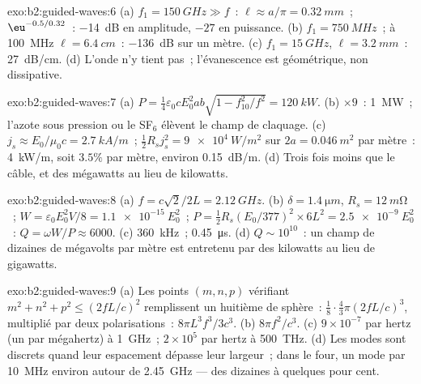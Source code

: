 \begin{solution}{exo:b2:guided-waves:6}
(a) $f_1 = \qty{150}{GHz} \gg f$~: $\ell \approx a/\pi = \qty{0.32}{mm}$~; $\eu^{-0.5/0.32}$~:
\qty{-14}{dB} en amplitude, $-27$ en puissance. (b) $f_1 = \qty{750}{MHz}$~; à \qty{100}{MHz}
$\ell = \qty{6.4}{cm}$~: \qty{-136}{dB} sur un mètre. (c) $f_1 = \qty{15}{GHz}$, $\ell =
\qty{3.2}{mm}$~: \qty{27}{dB/cm}. (d) L'onde n'y tient pas~; l'évanescence est
géométrique, non dissipative.
\end{solution}

\begin{solution}{exo:b2:guided-waves:7}
(a) $P = \tfrac14\varepsilon_0cE_0^2ab\sqrt{1 - f_{10}^2/f^2} = \qty{120}{kW}$. (b) $\times9$~:
\qty{1}{MW}~; l'azote sous pression ou le SF$_6$ élèvent le champ de claquage. (c)
$j_s \approx E_0/\mu_0c = \qty{2.7}{kA/m}$~; $\tfrac12R_sj_s^2 = \qty{9e4}{W/m^2}$ sur $2a =
\qty{0.046}{m^2}$ par mètre~: \qty{4}{kW/m}, soit $3.5\%$ par mètre, environ \qty{0.15}{dB/m}.
(d) Trois fois moins que le câble, et des mégawatts au lieu de
kilowatts.
\end{solution}

\begin{solution}{exo:b2:guided-waves:8}
(a) $f = c\sqrt2/2L = \qty{2.12}{GHz}$. (b) $\delta = \qty{1.4}{\micro m}$, $R_s = \qty{12}{m\ohm}$~;
$W = \varepsilon_0E_0^2V/8 = \qty{1.1e-15}{}E_0^2$~; $P = \tfrac12R_s(E_0/377)^2 \times 6L^2 =
\qty{2.5e-9}{}E_0^2$~: $Q = \omega W/P \approx 6000$. (c) \qty{360}{kHz}~; \qty{0.45}{\micro s}. (d)
$Q \sim 10^{10}$~: un champ de dizaines de mégavolts par mètre est entretenu par
des kilowatts au lieu de gigawatts.
\end{solution}

\begin{solution}{exo:b2:guided-waves:9}
(a) Les points $(m, n, p)$ vérifiant $m^2 + n^2 + p^2 \le (2fL/c)^2$ remplissent un huitième
de sphère~: $\tfrac18\cdot\tfrac43\pi(2fL/c)^3$, multiplié par deux polarisations~:
$8\pi L^3f^3/3c^3$. (b) $8\pi f^2/c^3$. (c) $9 \times 10^{-7}$ par hertz (un par
mégahertz) à \qty{1}{GHz}~; $2 \times 10^5$ par hertz à \qty{500}{THz}. (d) Les modes sont
discrets quand leur espacement dépasse leur largeur~; dans le four, un mode
par \qty{10}{MHz} environ autour de \qty{2.45}{GHz} --- des dizaines à quelques
pour cent.
\end{solution}

